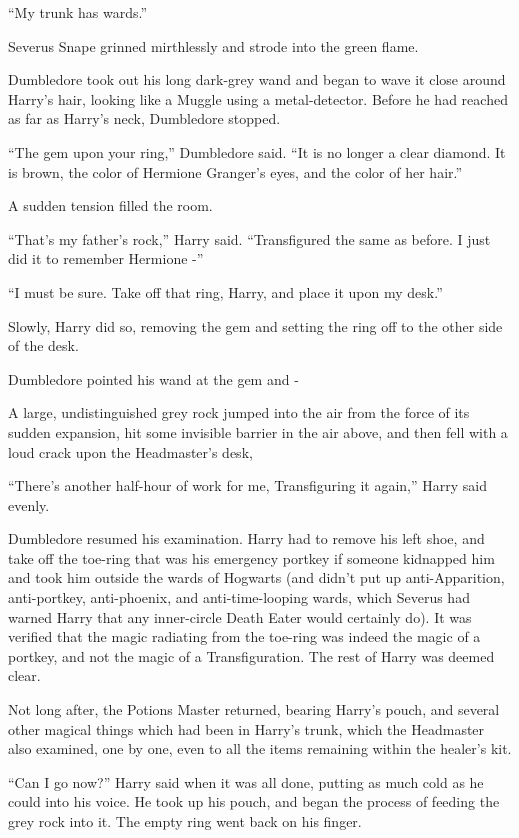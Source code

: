 ``My trunk has wards.''

Severus Snape grinned mirthlessly and strode into the green flame.

Dumbledore took out his long dark-grey wand and began to wave it close
around Harry's hair, looking like a Muggle using a metal-detector.
Before he had reached as far as Harry's neck, Dumbledore stopped.

``The gem upon your ring,'' Dumbledore said. ``It is no longer a clear
diamond. It is brown, the color of Hermione Granger's eyes, and the
color of her hair.''

A sudden tension filled the room.

``That's my father's rock,'' Harry said. ``Transfigured the same as
before. I just did it to remember Hermione -''

``I must be sure. Take off that ring, Harry, and place it upon my
desk.''

Slowly, Harry did so, removing the gem and setting the ring off to the
other side of the desk.

Dumbledore pointed his wand at the gem and -

A large, undistinguished grey rock jumped into the air from the force of
its sudden expansion, hit some invisible barrier in the air above, and
then fell with a loud crack upon the Headmaster's desk,

``There's another half-hour of work for me, Transfiguring it again,''
Harry said evenly.

Dumbledore resumed his examination. Harry had to remove his left shoe,
and take off the toe-ring that was his emergency portkey if someone
kidnapped him and took him outside the wards of Hogwarts (and didn't put
up anti-Apparition, anti-portkey, anti-phoenix, and anti-time-looping
wards, which Severus had warned Harry that any inner-circle Death Eater
would certainly do). It was verified that the magic radiating from the
toe-ring was indeed the magic of a portkey, and not the magic of a
Transfiguration. The rest of Harry was deemed clear.

Not long after, the Potions Master returned, bearing Harry's pouch, and
several other magical things which had been in Harry's trunk, which the
Headmaster also examined, one by one, even to all the items remaining
within the healer's kit.

``Can I go now?'' Harry said when it was all done, putting as much cold
as he could into his voice. He took up his pouch, and began the process
of feeding the grey rock into it. The empty ring went back on his
finger.

